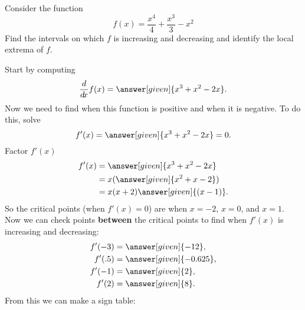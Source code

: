 \documentclass{ximera}
\begin{document}
\begin{example}\label{E:localextrema}
Consider the function 
\[
f(x) = \frac{x^4}{4}+\frac{x^3}{3}-x^2
\]
Find the intervals on which $f$ is increasing and decreasing and
identify the local extrema of $f$.


\begin{explanation}
Start by computing
\[
\ddx f(x) = \answer[given]{x^3+x^2-2x}.
\]
Now we need to find when this function is positive and when it is
negative. To do this, solve 
\[
f'(x) = \answer[given]{x^3+x^2-2x} =0.
\]
Factor $f'(x)$
\begin{align*}
f'(x) &= \answer[given]{x^3+x^2-2x} \\
&=x(\answer[given]{x^2+x-2})\\
&=x(x+2)\answer[given]{(x-1)}.
\end{align*}
So the critical points (when $f'(x)=0$) are when $x=-2$, $x=0$, and
$x=1$. Now we can check points \textbf{between} the critical points to find
when $f'(x)$ is increasing and decreasing:
\begin{align*}
  f'(-3)&=\answer[given]{-12},\\
  f'(.5)&=\answer[given]{-0.625},\\
  f'(-1)&=\answer[given]{2},\\
  f'(2)&=\answer[given]{8}.
\end{align*}
From this we can make a sign table:

\begin{image}
\end{image}
\end{explanation}
\end{example}
\end{document}
